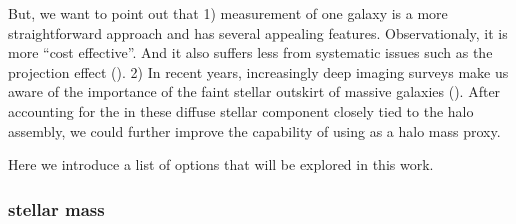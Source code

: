 \documentclass[a4paper,fleqn,usenatbib]{mnras}
\begin{document}
    But, we want to point out that
    1) \mstar{} measurement of one galaxy is a more straightforward approach and has several
    appealing features. Observationaly, it is more ``cost effective''. And it also suffers less
    from systematic issues such as the projection effect (\addref{}).
    2) In recent years, increasingly deep imaging surveys make us aware of the importance of the
    faint stellar outskirt of massive galaxies (\addref{}).
    After accounting for the \mstar{} in these diffuse stellar component closely tied to the
    halo assembly, we could further improve the capability of using \mstar{} as a halo mass proxy.

    Here we introduce a list of \mstar{} options that will be explored in this work.

\subsubsection{\cmodel{} stellar mass}
    \label{sec:mcmodel}

\end{document}
